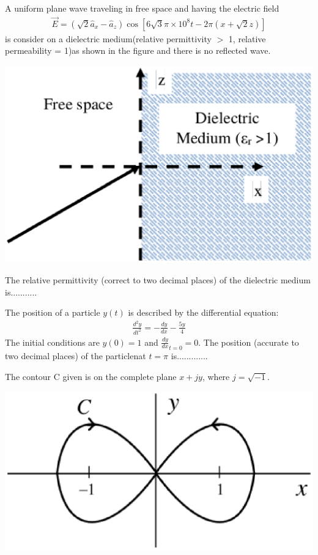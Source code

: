 \item A uniform plane wave traveling in free space and having the electric field
\begin{align*}
\overrightarrow{E}=(\sqrt{2}\hat{a}_{x}-\hat{a}_{z})\cos[6\sqrt{3}\pi \times 10^{8}t-2\pi(x+\sqrt{2}z)]
\end{align*}
is consider on a dielectric medium(relative permittivity $>$ 1, relative permeability = 1)as shown in the figure and there is no reflected wave.

\includegraphics[scale=0.38]{59}

The relative permittivity (correct to two decimal places) of the dielectric medium is...........

\item The position of a particle $y(t)$ is described by the differential equation:
\begin{align}
\frac{d^2y}{dt^2} = -\frac{dy}{dx} - \frac{5y}{4}
\end{align}
The initial conditions are $y(0) = 1$ and $\frac{dy}{dx}_{t = 0} = 0$. The position (accurate to two decimal places) of the particlenat $t = \pi$ is.............

\item The contour C given is on the complete plane $x + jy$, where $j = \sqrt{-1}$.

\includegraphics[scale=0.4]{61}

